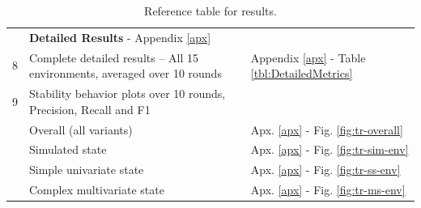 \documentclass[a4paper, 12pt]{article}
\newcommand{\ltmidrule} {\arrayrulecolor{black!20} \midrule}
\begin{document}
\begin{table}[h]
\begin{tabular}{R{0.25cm} L{11.5cm} L{3cm}}
		 & \textbf{Detailed Results} - Appendix \ref{apx} & \\
		8 & Complete detailed results -- All 15 environments, averaged over 10 rounds & Appendix \ref{apx} - Table \ref{tbl:DetailedMetrics}\\\ltmidrule
		
		9 & Stability behavior plots over 10 rounds, Precision, Recall and F1\\
		& \quad\quad Overall (all variants)  & Apx. \ref{apx} - Fig. \ref{fig:tr-overall}\\
		& \quad\quad Simulated state & Apx. \ref{apx} - Fig. \ref{fig:tr-sim-env}\\
		& \quad\quad Simple univariate state & Apx. \ref{apx} - Fig. \ref{fig:tr-ss-env}\\
		& \quad\quad Complex multivariate state & Apx. \ref{apx} - Fig. \ref{fig:tr-ms-env}\\
		\bottomrule
	\end{tabular}
	\caption{Reference table for results.}
	\label{tbl:ref-results}
\end{table}
\end{document}

